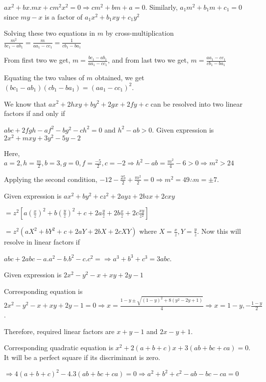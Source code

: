   $ax^2 + bx.mx + cm^2x^2 = 0 \Rightarrow cm^2 + bm + a = 0$. Similarly, $a_1m^2 + b_1m + c_1 = 0$ since $my
  - x$ is a factor of $a_1x^2 + b_1xy + c_1y^2$

  Solving these two equations in $m$ by cross-multiplication $\frac{m^2}{bc_1 - ab_1} = \frac{m}{aa_1 -
    cc_1} = \frac{1}{cb_1 - ba_1}$

  From first two we get, $m = \frac{bc_1 - ab_1}{aa_1 - cc_1}$, and from last two we get, $m = \frac{aa_1 -
    cc_1}{cb_1 - ba_1}$

  Equating the two values of $m$ obtained, we get $(bc_1 - ab_1)(cb_1 - ba_1) = (aa_1 - cc_1)^2$.
\item We know that $ax^2 + 2hxy + by^2 + 2gx + 2fy + c$ can be resolved into two linear factors if and only if

  $abc + 2fgh - af^2 - bg^2 - ch^2 = 0$ and $h^2 - ab > 0$. Given expression is $2x^2 + mxy + 3y^2 - 5y - 2$

  Here, $a = 2, h = \frac{m}{2}, b = 3, g = 0, f = \frac{-5}{2}, c = -2\Rightarrow h^2 - ab = \frac{m^2}{4}
  - 6 > 0\Rightarrow m^2 > 24$

  Applying the second condition, $-12 - \frac{25}{2} + \frac{m^2}{2} = 0\Rightarrow m^2 = 49 \therefore m =
  \pm 7$.
\item Given expression is $ax^2 + by^2 + cz^2 + 2ayz + 2bzx + 2cxy$

  $= z^2\left[a\left(\frac{x}{z}\right)^2 + b\left(\frac{y}{z}\right)^2 + c + 2a\frac{y}{z} + 2b\frac{x}{z}
  + 2c\frac{xy}{z^2}\right]$

  $= z^2(aX^2 + bY^2 + c + 2aY + 2bX + 2cXY)$ where $X = \frac{x}{z}, Y = \frac{y}{z}$. Now this will
  resolve in linear factors if

  $abc + 2abc - a.a^2 - b.b^2 -c.c^2 = \Rightarrow a^3 + b^3 + c^3 = 3abc$.
\item Given expression is $2x^2 - y^2 - x + xy + 2y -1$

  Corresponding equation is $2x^2 - y^2 - x + xy + 2y -1 = 0\Rightarrow x = \frac{1 - y \pm \sqrt{(1 - y)^2
      + 8(y^2 - 2y + 1)}}{4}\Rightarrow x = 1 - y, -\frac{1 - y}{2}$.

  Therefore, required linear factors are $x + y - 1$ and $2x - y + 1$.
\item Corresponding quadratic equation is $x^2 + 2(a + b + c)x + 3(ab + bc + ca) = 0$. It will be a perfect
  square if its discriminant is zero.

  $\Rightarrow 4(a + b + c)^2 - 4.3(ab + bc + ca) = 0\Rightarrow a^2 + b^2 + c^2 - ab - bc - ca =
  0$

